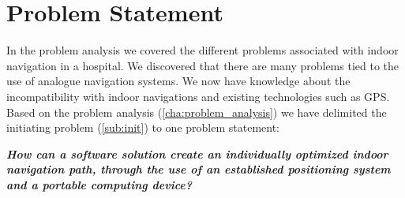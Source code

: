 \chapter{Problem Statement}



In the problem analysis we covered the different problems associated with indoor navigation in a hospital.
We discovered that there are many problems tied to the use of analogue navigation systems. We now have knowledge about the incompatibility with indoor navigations and existing technologies such as GPS.
Based on the problem analysis (\cref{cha:problem_analysis}) we have delimited the initiating problem (\cref{sub:init}) to one problem statement:


\textit{\textbf{How can a software solution create an individually optimized indoor navigation path, through the use of an established positioning system and a portable computing device?}}
